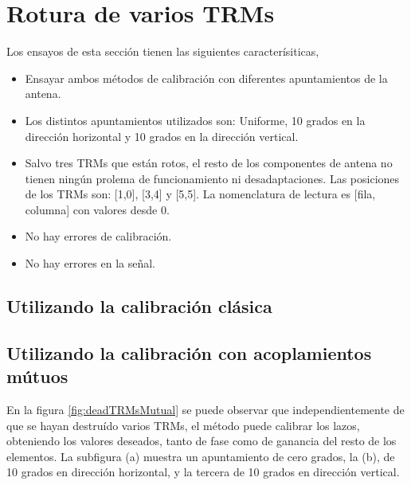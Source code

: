 \section{Rotura de varios TRMs}

Los ensayos de esta sección tienen las siguientes caracterísiticas,
\begin{itemize}
	\item Ensayar ambos métodos de calibración con diferentes apuntamientos de la antena.
	\item Los distintos apuntamientos utilizados son: Uniforme, 10 grados en la dirección horizontal y 10 grados en la dirección 
		vertical.
	\item Salvo tres TRMs que están rotos, el resto de los componentes de antena no tienen ningún prolema de funcionamiento ni 
		desadaptaciones. Las posiciones de los TRMs son: [1,0], [3,4] y [5,5]. La nomenclatura de lectura es [fila, columna] con 
		valores desde 0.
	\item No hay errores de calibración.
	\item No hay errores en la señal.
\end{itemize}

\subsection{Utilizando la calibración clásica}
\subsection{Utilizando la calibración con acoplamientos mútuos}

En la figura \ref{fig:deadTRMsMutual} se puede observar que independientemente de que se hayan destruído varios TRMs, el 
método puede calibrar los lazos, obteniendo los valores deseados, tanto de fase como de ganancia del resto de los elementos.
La subfigura (a) muestra un apuntamiento de cero grados, la (b), de 10 grados en dirección horizontal, y la tercera de 10 grados
en dirección vertical.

